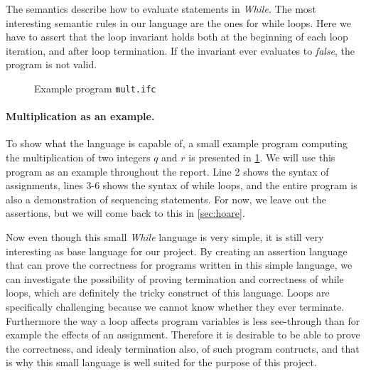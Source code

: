 The semantics describe how to evaluate statements in \textit{While}. The most interesting semantic rules in our language are the ones for while loops.
Here we have to assert that the loop invariant holds both at the beginning of each loop iteration, and after loop termination.
If the invariant ever evaluates to \textit{false}, the program is not valid.

\begin{figure}[h]

\caption{Example program \texttt{mult.ifc}}
\label{figure:basicmult}
\end{figure}

\paragraph{Multiplication as an example.}
To show what the language is capable of, a small example program computing the multiplication of two integers $q$ and $r$ is presented in \cref{figure:basicmult}. 
We will use this program as an example throughout the report.
Line 2 shows the syntax of assignments, lines $3$-$6$ shows the syntax of while loops, and the entire program is also a demonstration of sequencing statements.
For now, we leave out the assertions, but we will come back to this in \cref{sec:hoare}.

Now even though this small \textit{While} language is very simple, it is still very interesting as base language for our project.
By creating an assertion language that can prove the correctness for programs written in this simple language, we can investigate the possibility of proving termination and correctness of while loops, which are definitely the tricky construct of this language.
Loops are specifically challenging because we cannot know whether they ever terminate. Furthermore the way a loop affects program variables is less see-through than for example the effects of an assignment.
Therefore it is desirable to be able to prove the correctness, and idealy termination also, of such program contructs, and that is why this small language is well suited for the purpose of this project.

